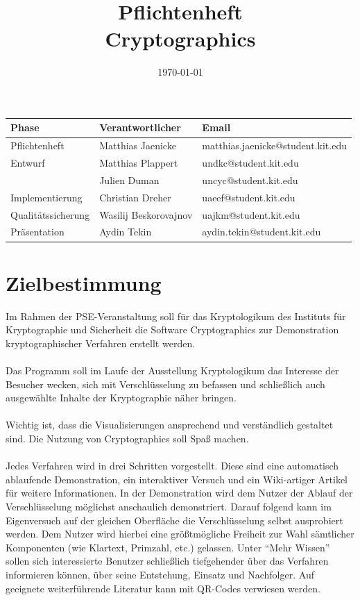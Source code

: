 \documentclass{article}
\title{\textbf{Pflichtenheft} \\ Cryptographics}
\author{}
\date{\today}
\begin{document}
\maketitle
\begin{table}[b]
  \begin{tabular}{| l | l | l |}
    \hline
    \textbf{Phase} & \textbf{Verantwortlicher} & \textbf{Email} \\ \hline
    Pflichtenheft & Matthias Jaenicke & matthias.jaenicke@student.kit.edu \\ \hline
    Entwurf & Matthias Plappert & undkc@student.kit.edu \\
            & Julien Duman & uncyc@student.kit.edu \\ \hline
    Implementierung & Christian Dreher & uaeef@student.kit.edu \\ \hline
    Qualitätssicherung & Wasilij Beskorovajnov & uajkm@student.kit.edu \\ \hline
    Präsentation & Aydin Tekin & aydin.tekin@student.kit.edu \\ \hline
    \end{tabular}
\end{table}
\newpage


\tableofcontents
\newpage

\section{Zielbestimmung}


Im Rahmen der PSE-Veranstaltung soll für das Kryptologikum des Instituts für
Kryptographie und Sicherheit die Software Cryptographics zur
Demonstration kryptographischer Verfahren erstellt werden. \\
\\
Das Programm soll im Laufe der Ausstellung Kryptologikum das Interesse der Besucher wecken, sich mit Verschlüsselung zu befassen und schließlich auch ausgewählte Inhalte der Kryptographie näher bringen. \\
\\
Wichtig ist, dass die Visualisierungen ansprechend und verständlich gestaltet sind. Die Nutzung von Cryptographics soll Spaß machen. \\
\\
Jedes Verfahren wird in drei Schritten vorgestellt. Diese sind eine automatisch ablaufende Demonstration, ein interaktiver Versuch und ein Wiki-artiger Artikel für weitere Informationen.
In der Demonstration wird dem Nutzer der Ablauf der Verschlüsselung möglichst anschaulich demonstriert. Darauf folgend kann im Eigenversuch auf der gleichen Oberfläche die Verschlüsselung selbst ausprobiert werden. Dem Nutzer wird hierbei eine größtmögliche Freiheit zur Wahl sämtlicher Komponenten (wie Klartext, Primzahl, etc.) gelassen. Unter ``Mehr Wissen'' sollen sich interessierte Benutzer schließlich tiefgehender über das Verfahren informieren können, über seine Entstehung, Einsatz und Nachfolger. Auf geeignete weiterführende Literatur kann mit QR-Codes verwiesen werden. \\
\end{document}
